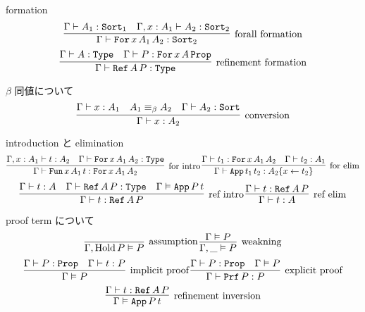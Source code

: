 \begin{itembox}[l]{formation}
  \[\infer[\text{forall formation}]{\Gamma \vdash \texttt{For} \, x \, A_1 \, A_2 : \texttt{Sort}_2}{\Gamma \vdash A_1 : \texttt{Sort}_1 & \Gamma , x : A_1 \vdash A_2 : \texttt{Sort}_2 }\]
  \[\infer[\text{refinement formation}]{\Gamma \vdash \texttt{Ref} \, A \, P : \texttt{Type}}{\Gamma \vdash A : \texttt{Type} & \Gamma \vdash P : \texttt{For} \, x \, A \, \texttt{Prop}}\]
\end{itembox}

\begin{itembox}[l]{\(\beta\) 同値について}
  \[\infer[\text{conversion}]{\Gamma \vdash x : A_2}{\Gamma \vdash x : A_1 & A_1 \equiv_{\beta} A_2 & \Gamma \vdash A_2 : \texttt{Sort}} \]
\end{itembox}

\begin{itembox}[l]{introduction と elimination}
  \[
    \infer[\text{for intro}]{\Gamma \vdash \texttt{Fun} \, x \, A_1 \, t : \texttt{For} \, x \, A_1 \, A_2}{\Gamma , x : A_1 \vdash t : A_2 & \Gamma \vdash \texttt{For} \, x \, A_1 \, A_2 : \texttt{Type}} \,
    \infer[\text{for elim}]{\Gamma \vdash \texttt{App} \, t_1 \, t_2 : A_2\{x \leftarrow t_2\}}{\Gamma \vdash t_1 : \texttt{For} \, x \, A_1 \, A_2 & \Gamma \vdash t_2 : A_1} \]
  \[
    \infer[\text{ref intro}]{\Gamma \vdash t : \texttt{Ref} \, A \, P}{\Gamma \vdash t : A & \Gamma \vdash \texttt{Ref} \, A \, P : \texttt{Type} & \Gamma \vDash \texttt{App} \, P \, t} \,
    \infer[\text{ref elim}]{\Gamma \vdash t : A}{\Gamma \vdash t : \texttt{Ref} \, A \, P} \]
\end{itembox}

\begin{itembox}[l]{proof term について}
  \[
    \infer[\text{assumption}]{\Gamma , \text{Hold} \, P \vDash P}{}\,
    \infer[\text{weakning}]{\Gamma , \_ \vDash P}{\Gamma \vDash P}
  \]
  \[
    \infer[\text{implicit proof}]{\Gamma \vDash P}{\Gamma \vdash P : \texttt{Prop} & \Gamma \vdash t : P} \,
    \infer[\text{explicit proof}]{\Gamma \vdash \texttt{Prf} \, P : P}{\Gamma \vdash P : \texttt{Prop} &\Gamma \vDash P} \]
  \[
    \infer[\text{refinement inversion}]{\Gamma \vDash \texttt{App} \, P \, t}{\Gamma \vdash t : \texttt{Ref} \, A \, P}\]
\end{itembox}